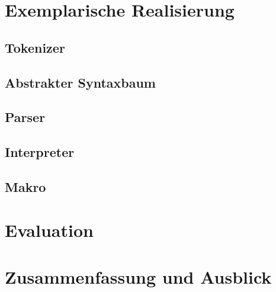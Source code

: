 \section{Exemplarische Realisierung}
\label{sec:Exemplarische Realisierung}
  \subsection{Tokenizer}
  \label{ssec:Tokenizer}

  \subsection{Abstrakter Syntaxbaum}
  \label{ssec:Abstrakter Syntaxbaum}

  \subsection{Parser}
  \label{ssec:Parser}

  \subsection{Interpreter}
  \label{ssec:Interpreter}

  \subsection{Makro}
  \label{ssec:Makro}

\section{Evaluation}
\label{sec:Evaluation}

\section{Zusammenfassung und Ausblick}
\label{sec:Zusammenfassung und Ausblick}

